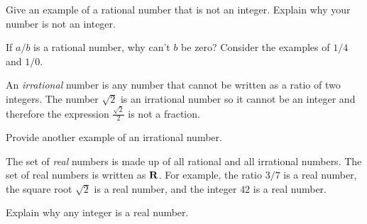 \documentclass[a4paper,oneside,12pt]{article}
\begin{document}

\begin{exercise}
Give an example of a rational number that is not an integer.  Explain
why your number is not an integer.
\end{exercise}


\begin{exercise}
If $a/b$ is a rational number, why can't $b$ be zero?  Consider the
examples of $1/4$ and $1/0$.
\end{exercise}


An \emph{irrational} number is any number that cannot be written as a
ratio of two integers.  The number $\sqrt{2}$ is an irrational number
so it cannot be an integer and therefore the expression
$\displaystyle{\frac{\sqrt{2}}{2}}$ is not a fraction.

\begin{exercise}
Provide another example of an irrational number.
\end{exercise}


The set of \emph{real} numbers is made up of all rational and all
irrational numbers.  The set of real numbers is written as $\mathbf{R}$.  For
example, the ratio $3/7$ is a real number, the square root $\sqrt{2}$
is a real number, and the integer $42$ is a real number.

\begin{exercise}
Explain why any integer is a real number.
\end{exercise}
\end{document}
